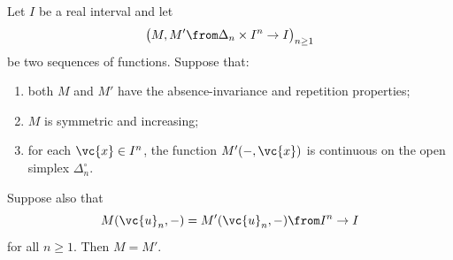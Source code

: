 \begin{propn}
% 
Let $I$ be a real interval and let 
\[
\bigl( M, M' \from \Delta_n \times I^n \to I \bigr)_{n \geq 1}
\]
be two sequences of functions.  Suppose that:
% 
\begin{enumerate}
\item 
both $M$ and $M'$ have the absence-invariance and repetition properties;

\item
$M$ is symmetric and increasing;

\item
for each $\vc{x} \in I^n$, the function $M'(-, \vc{x})$ is continuous on
the open simplex $\Delta_n^\circ$.
\end{enumerate}
% 
Suppose also that
\[
M(\vc{u}_n, -) = M'(\vc{u}_n, -) \from I^n \to I
\]
for all $n \geq 1$.  Then $M = M'$.
\end{propn}


